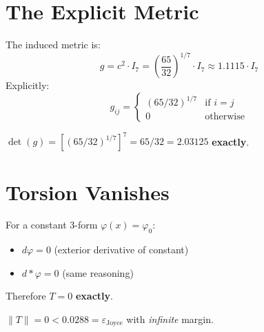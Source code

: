 \section{The Explicit Metric}

\begin{theorem}\label{thm:metric_form}
    \leanok
    The induced metric is:
    \[
        g = c^2 \cdot I_7 = \left(\frac{65}{32}\right)^{1/7} \cdot I_7 \approx 1.1115 \cdot I_7
    \]
    Explicitly:
    \[
        g_{ij} = \begin{cases}
            (65/32)^{1/7} & \text{if } i = j \\
            0 & \text{otherwise}
        \end{cases}
    \]
\end{theorem}

\begin{theorem}\label{thm:det_exact}
    \leanok
    $\det(g) = \left[(65/32)^{1/7}\right]^7 = 65/32 = 2.03125$ \textbf{exactly}.
\end{theorem}

\section{Torsion Vanishes}

\begin{theorem}\label{thm:torsion_zero}
    \leanok
    For a constant 3-form $\varphi(x) = \varphi_0$:
    \begin{itemize}
        \item $d\varphi = 0$ (exterior derivative of constant)
        \item $d{*}\varphi = 0$ (same reasoning)
    \end{itemize}
    Therefore $T = 0$ \textbf{exactly}.
\end{theorem}

\begin{theorem}\label{thm:joyce_exact}
    \leanok
    $\|T\| = 0 < 0.0288 = \varepsilon_{\text{Joyce}}$ with \emph{infinite} margin.
\end{theorem}

